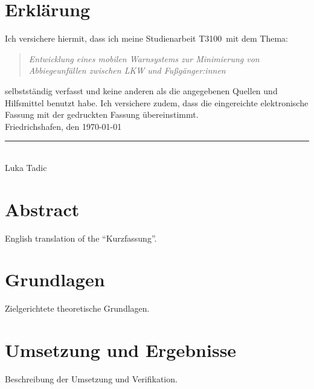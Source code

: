 \documentclass[a4paper, 12pt]{article} %
\newcommand{\titel}{Entwicklung eines mobilen Warnsystems zur Minimierung von Abbiegeunfällen zwischen LKW und Fußgänger:innen}
\newcommand{\arbeit}{Studienarbeit T3100}
\newcommand{\autor}{Luka Tadic}
\begin{document}
\clearpage

\pagestyle{scrheadings}  %
\hypersetup{pageanchor=true}

\section*{Erklärung}

Ich versichere hiermit, dass ich meine \arbeit\ mit dem Thema:

\begin{quote}
    \textit{\titel}
\end{quote}

selbstständig verfasst und keine anderen als die angegebenen Quellen und Hilfsmittel benutzt habe.  
Ich versichere zudem, dass die eingereichte elektronische Fassung mit der gedruckten Fassung übereinstimmt.\\[6ex]

Friedrichshafen, den \today \\[1ex]
\rule[-0.2cm]{5cm}{0.5pt} \\  
\autor \\[10ex]

\rmfamily

\clearpage
\section*{Abstract}
English translation of the “Kurzfassung”.

\clearpage

\tableofcontents

\clearpage

\section{Grundlagen}
Zielgerichtete theoretische \cite{VIETH1999842}Grundlagen.

\clearpage

\section{Umsetzung und Ergebnisse}
Beschreibung der Umsetzung und Verifikation.
\end{document}
